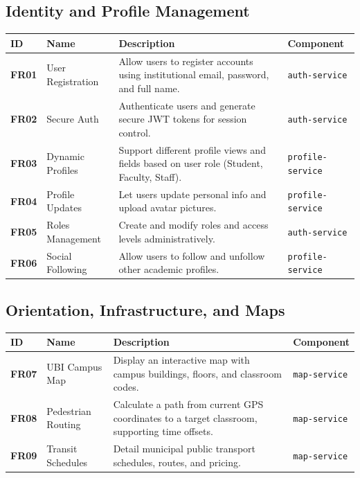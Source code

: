 \subsection{Identity and Profile Management}
\begin{tabular}{|l|l|p{7.5cm}|l|}
\hline
\textbf{ID} & \textbf{Name} & \textbf{Description} & \textbf{Component} \\ \hline
\textbf{FR01} & User Registration & Allow users to register accounts using institutional email, password, and full name. & \texttt{auth-service} \\ \hline
\textbf{FR02} & Secure Auth & Authenticate users and generate secure \ac{JWT} tokens for session control. & \texttt{auth-service} \\ \hline
\textbf{FR03} & Dynamic Profiles & Support different profile views and fields based on user role (Student, Faculty, Staff). & \texttt{profile-service} \\ \hline
\textbf{FR04} & Profile Updates & Let users update personal info and upload avatar pictures. & \texttt{profile-service} \\ \hline
\textbf{FR05} & Roles Management & Create and modify roles and access levels administratively. & \texttt{auth-service} \\ \hline
\textbf{FR06} & Social Following & Allow users to follow and unfollow other academic profiles. & \texttt{profile-service} \\ \hline
\end{tabular}

\subsection{Orientation, Infrastructure, and Maps}
\begin{tabular}{|l|l|p{7.5cm}|l|}
\hline
\textbf{ID} & \textbf{Name} & \textbf{Description} & \textbf{Component} \\ \hline
\textbf{FR07} & \ac{UBI} Campus Map & Display an interactive map with campus buildings, floors, and classroom codes. & \texttt{map-service} \\ \hline
\textbf{FR08} & Pedestrian Routing & Calculate a path from current \ac{GPS} coordinates to a target classroom, supporting time offsets. & \texttt{map-service} \\ \hline
\textbf{FR09} & Transit Schedules & Detail municipal public transport schedules, routes, and pricing. & \texttt{map-service} \\ \hline
\end{tabular}

